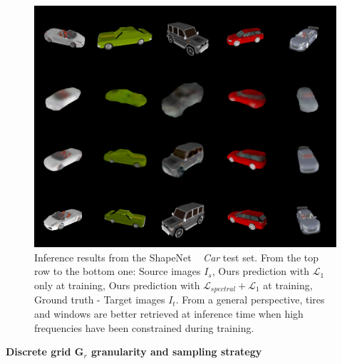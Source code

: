 \begin{figure}[h!]
    \begin{center}
    \includegraphics[width=.5\textwidth]{images/epipolarnvs/spectralCar.jpg}
    \end{center}
     \caption{Inference results from the ShapeNet ~\cite{chang2015shapenet} \textit{Car} test set. From the top row to the bottom one: Source images  $I_s$, Ours prediction with $\mathcal{L}_{1}$ only at training, Ours prediction with  $\mathcal{L}_{spectral} + \mathcal{L}_{1}$ at training, Ground truth - Target images $I_t$. From a general perspective, tires and windows are better retrieved at inference time when high frequencies have been constrained during training.}
     \label{fig:spectral_res}
\end{figure}

\newpage\textbf{Discrete grid $\textbf{G}_{r}$ granularity and sampling strategy}

